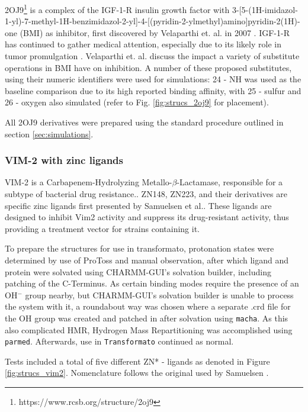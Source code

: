 \documentclass[oneside]{scrreprt}
\begin{document}
2OJ9\footnote{https://www.rcsb.org/structure/2oj9} is a complex of the IGF-1-R insulin growth factor with 3-[5-(1H-imidazol-1-yl)-7-methyl-1H-benzimidazol-2-yl]-4-[(pyridin-2-ylmethyl)amino]pyridin-2(1H)-one (BMI) as inhibitor, first discovered by Velaparthi et. al. in 2007 \cite{velaparthi_discovery_2007}. IGF-1-R has continued to gather medical attention, especially due to its likely role in tumor promulgation \cite{chiu_disruption_2018}. Velaparthi et. al. discuss the impact a variety of substitute operations in BMI have on inhibition. A number of these proposed substitutes, using their numeric identifiers were used for simulations: 24 - NH was used as the baseline comparison due to its high reported binding affinity, with 25 - sulfur and 26 - oxygen also simulated (refer to Fig. \ref{fig:strucs_2oj9} for placement).

All 2OJ9 derivatives were prepared using the standard procedure outlined in section \ref{sec:simulations}.
\subsubsection{VIM-2 with zinc ligands}

VIM-2 is a Carbapenem-Hydrolyzing Metallo-$\beta$-Lactamase, responsible for a subtype of bacterial drug resistance.\cite{Poirel2000Apr}. ZN148, ZN223, and their derivatives are specific zinc ligands first presented by Samuelsen et al.\cite{Samuelsen2020Jun}. These ligands are designed to inhibit Vim2 activity and suppress its drug-resistant activity, thus providing a treatment vector for strains containing it. 

To prepare the structures for use in transformato, protonation states were determined by use of ProToss\cite{Lippert2009Dec,Bietz2014Dec} and manual observation, after which ligand and protein were solvated using CHARMM-GUI's solvation builder, including patching of the C-Terminus. As certain binding modes require the presence of an OH$^-$ group nearby, but CHARMM-GUI's solvation builder is unable to process the system with it, a roundabout way was chosen where a separate .crd file for the OH group was created and patched in after solvation using \texttt{macha}\cite{twotoneblue2022May}. As this also complicated HMR, Hydrogen Mass Repartitioning was accomplished using \texttt{parmed}\cite{Shirts2016Sep}. Afterwards, use in \texttt{Transformato} continued as normal.

Tests included a total of five different ZN* - ligands as denoted in Figure \ref{fig:strucs_vim2}. Nomenclature follows the original used by Samuelsen \cite{Samuelsen2020Jun}.
\end{document}
